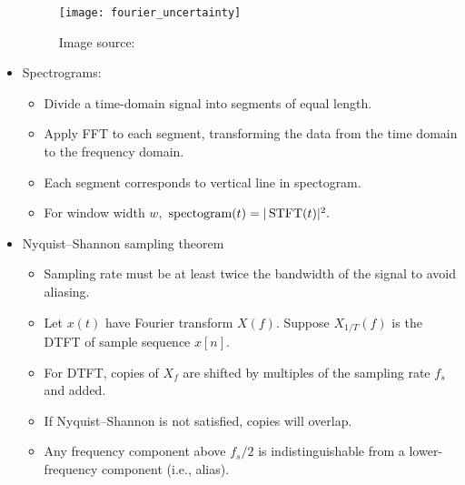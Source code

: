 \documentclass[../ds]{subfiles}
\begin{document}
\begin{itemize}
\begin{figure}[ht]
	\centering
	\texttt{[image: fourier\_uncertainty]}
	\caption*{Image source: \cite{fourier_qiml}}
\end{figure}

\item 
Spectrograms:
	\begin{itemize}
	\item 
	Divide a time-domain signal into segments of equal length.
	
	\item 
	Apply FFT to each segment, transforming the data from the time domain to the frequency domain.
	
	\item 
	Each segment corresponds to vertical line in spectogram.
	
	\item 
	For window width $w,$ $\text{spectogram}(t) = |\operatorname{STFT}(t)|^2.$
	\end{itemize}

\item 
Nyquist–Shannon sampling theorem
	\begin{itemize}
	\item 
	Sampling rate must be at least twice the bandwidth of the signal to avoid aliasing.
	
	\item 
	Let $x(t)$ have Fourier transform $X(f).$ Suppose $X_{1/T}(f)$ is the DTFT of sample sequence $x[n].$ 
	
	\item 
	For DTFT, copies of $X_f$ are shifted by multiples of the sampling rate $f_s$ and added.
	
	\item
	If Nyquist–Shannon is not satisfied, copies will overlap.
	
	\item 
	Any frequency component above $f_s/2$ is indistinguishable from a lower-frequency component (i.e., alias).
	\end{itemize}
\end{itemize}
\end{document}
